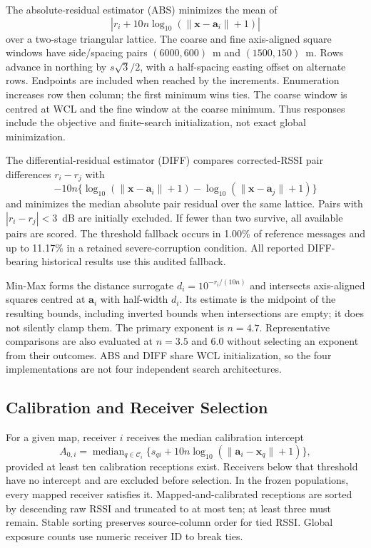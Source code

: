 \documentclass[11pt,a4paper]{article}
\newcommand{\med}{\operatorname{median}}
\begin{document}
The absolute-residual estimator (ABS) minimizes the mean of
\begin{equation}|r_i+10n\log_{10}(\|\mathbf x-\mathbf a_i\|+1)|\label{eq:abs}\end{equation}
over a two-stage triangular lattice. The coarse and fine axis-aligned square windows have side/spacing pairs $(6000,600)$~m and $(1500,150)$~m. Rows advance in northing by $s\sqrt{3}/2$, with a half-spacing easting offset on alternate rows. Endpoints are included when reached by the increments. Enumeration increases row then column; the first minimum wins ties. The coarse window is centred at WCL and the fine window at the coarse minimum. Thus responses include the objective and finite-search initialization, not exact global minimization.

The differential-residual estimator (DIFF) compares corrected-RSSI pair differences $r_i-r_j$ with
\begin{equation}-10n\{\log_{10}(\|\mathbf x-\mathbf a_i\|+1)-\log_{10}(\|\mathbf x-\mathbf a_j\|+1)\}\label{eq:diff}\end{equation}
and minimizes the median absolute pair residual over the same lattice. Pairs with $|r_i-r_j|<3$~dB are initially excluded. If fewer than two survive, all available pairs are scored. The threshold fallback occurs in 1.00\% of reference messages and up to 11.17\% in a retained severe-corruption condition. All reported DIFF-bearing historical results use this audited fallback.

Min-Max forms the distance surrogate $d_i=10^{-r_i/(10n)}$ and intersects axis-aligned squares centred at $\mathbf a_i$ with half-width $d_i$. Its estimate is the midpoint of the resulting bounds, including inverted bounds when intersections are empty; it does not silently clamp them. The primary exponent is $n=4.7$. Representative comparisons are also evaluated at $n=3.5$ and $6.0$ without selecting an exponent from their outcomes. ABS and DIFF share WCL initialization, so the four implementations are not four independent search architectures.

\subsection{Calibration and Receiver Selection}\label{sec:calibration}
For a given map, receiver $i$ receives the median calibration intercept
\begin{equation}
 A_{0,i}=\med_{q\in\mathcal C_i}\{s_{qi}+10n\log_{10}(\|\mathbf a_i-\mathbf x_q\|+1)\},
\label{eq:cal}
\end{equation}
provided at least ten calibration receptions exist. Receivers below that threshold have no intercept and are excluded before selection. In the frozen populations, every mapped receiver satisfies it. Mapped-and-calibrated receptions are sorted by descending raw RSSI and truncated to at most ten; at least three must remain. Stable sorting preserves source-column order for tied RSSI. Global exposure counts use numeric receiver ID to break ties.
\end{document}
